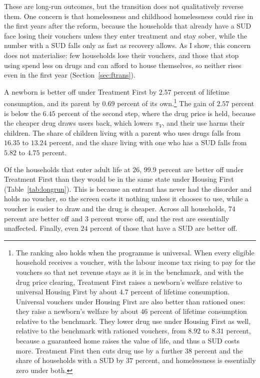 \documentclass[10pt]{article}
\newif\ifshowupdates \showupdatesfalse
\newcommand{\updnum}[1]{\ifshowupdates{\color{blue}#1}\else#1\fi}
\begin{document}
\updnum{These are long-run outcomes, but the transition does not qualitatively reverse them. One concern is that homelessness and childhood homelessness could rise in the first years after the reform, because the households that already have a SUD face losing their vouchers unless they enter treatment and stay sober, while the number with a SUD falls only as fast as recovery allows. As I show, this concern does not materialise: few households lose their vouchers, and those that stop using spend less on drugs and can afford to house themselves, so neither rises even in the first year (Section~\ref{sec:ftrans}).}

A newborn is better off under Treatment First by $2.57$ percent of lifetime consumption, and its parent by $0.69$ percent of its own.\footnote{The ranking also holds when the programme is universal.  When every eligible household receives a voucher, with the labour income tax rising to pay for the vouchers so that net revenue stays as it is in the benchmark, and with the drug price clearing, Treatment First raises a newborn's welfare relative to universal Housing First by about $4.7$ percent of lifetime consumption.  Universal vouchers under Housing First are also better than rationed ones: they raise a newborn's welfare by about $46$ percent of lifetime consumption relative to the benchmark. They lower drug use under Housing First as well, relative to the benchmark with rationed vouchers, from $8.92$ to $8.31$ percent, because  a guaranteed home raises the value of life, and thus a SUD costs more. Treatment First then cuts drug use by a further $38$ percent and the share of households with a SUD by $37$ percent, and homelessness is  essentially zero under both. } The gain of $2.57$ percent is below the $6.45$ percent of the second step, where the drug price is held, because the cheaper drug draws users back, which lowers $\pi_V$, and their use harms their children. The share of children living with a parent who uses drugs falls from $16.35$ to $13.24$ percent, and the share living with one who has a SUD falls from $5.82$ to $4.75$ percent.

Of the households that enter adult life at 26, $99.9$ percent are better off under Treatment First than they would be in the same state under Housing First (Table~\ref{tab:longrun}). This is because an entrant has never had the disorder and holds no voucher, so the screen costs it nothing unless it chooses to use, while a voucher is easier to draw and the drug is cheaper.  Across all households, $74$ percent are better off and $3$ percent worse off, and the rest are essentially unaffected. Finally, even $24$ percent of those that have a SUD are better off.
\end{document}
